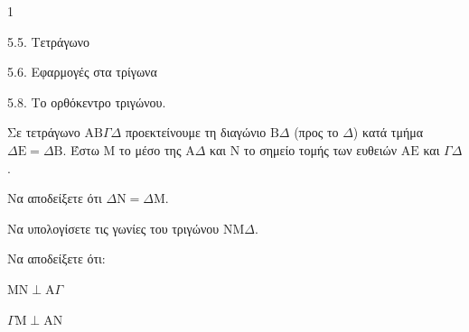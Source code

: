 \begin{ylh}{1}
    \item 5.5. Τετράγωνο
    \item 5.6. Εφαρμογές στα τρίγωνα
    \item 5.8. Το ορθόκεντρο τριγώνου.
\end{ylh}
Σε τετράγωνο $\mathrm{A}\mathrm{B}\Gamma\Delta$ προεκτείνουμε τη διαγώνιο $\mathrm{B}\Delta$ (προς το $\Delta$) κατά τμήμα $\Delta\mathrm{E} = \Delta\mathrm{B}$. Έστω $\mathrm{M}$ το μέσο της $\mathrm{A}\Delta$ και $\mathrm{N}$ το σημείο τομής των ευθειών $\mathrm{A}\mathrm{E}$ και $\Gamma\Delta$.
\begin{alist}
    \item Να αποδείξετε ότι $\Delta\mathrm{N} = \Delta\mathrm{M}$. 
    \item Να υπολογίσετε τις γωνίες του τριγώνου $\mathrm{N}\mathrm{M}\Delta$. 
    \item Να αποδείξετε ότι:
    \begin{rlist}
        \item $\mathrm{M}\mathrm{N} \perp \mathrm{A}\Gamma$ 
        \item $\Gamma\mathrm{M} \perp \mathrm{A}\mathrm{N}$ 
    \end{rlist}
\end{alist}
